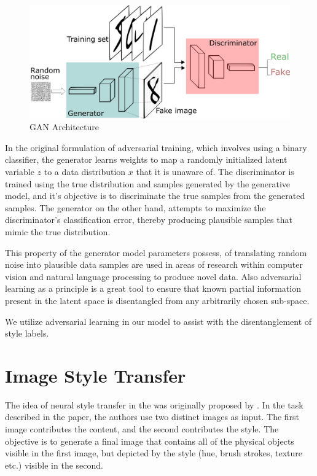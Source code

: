 \begin{figure}[ht]
	\centering
	\includegraphics[width=\textwidth]{images/gans}
	\caption{\label{fig:gans} GAN Architecture}
\end{figure}

In the original formulation of adversarial training, which involves using a binary classifier, the generator learns weights to map a randomly initialized latent variable $z$ to a data distribution $x$ that it is unaware of. The discriminator is trained using the true distribution and samples generated by the generative model, and it's objective is to discriminate the true samples from the generated samples. The generator on the other hand, attempts to maximize the discriminator's classification error, thereby producing plausible samples that mimic the true distribution.

This property of the generator model parameters possess, of translating random noise into plausible data samples are used in areas of research within computer vision and natural language processing to produce novel data. Also adversarial learning as a principle is a great tool to ensure that known partial information present in the latent space is disentangled from any arbitrarily chosen sub-space.

We utilize adversarial learning in our model to assist with the disentanglement of style labels.


\section{Image Style Transfer}

The idea of neural style transfer in the was originally proposed by \cite{gatys2016image}. In the task described in the paper, the authors use two distinct images as input. The first image contributes the content, and the second contributes the style. The objective is to generate a final image that contains all of the physical objects visible in the first image, but depicted by the style (hue, brush strokes, texture etc.) visible in the second.


